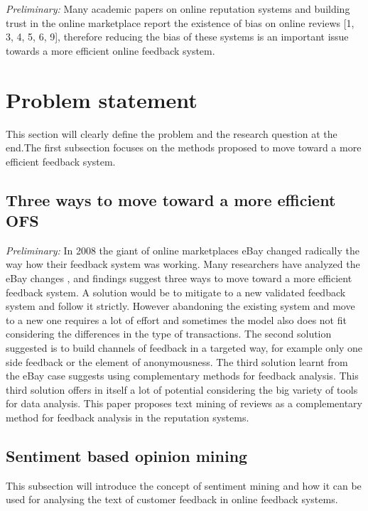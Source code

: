 \textit{Preliminary:} Many academic papers on online reputation systems and building trust in the online marketplace report the existence of bias on online reviews [1, 3, 4, 5, 6, 9], therefore reducing the bias of these systems is an important issue towards a more efficient online feedback system. 

\section{Problem statement}
\label{sec:problemstatement}
This section will clearly define the problem and the research question at the end.The first subsection focuses on the methods proposed to move toward a more efficient feedback system.

\subsection{Three ways to move toward a more efficient OFS}
\textit{Preliminary:} In 2008 the giant of online marketplaces eBay changed radically the way how their feedback system was working. Many researchers have analyzed the eBay changes \cite{fradkin2016bias,resnick2006value,bolton2013engineering,dini2009buying,dellarocas2008sound}, and findings suggest three ways to move toward a more efficient feedback system. A solution would be to mitigate to a new validated feedback system and follow it strictly. However abandoning the existing system and move to a new one requires a lot of effort and sometimes the model also does not fit considering the differences in the type of transactions. The second solution suggested is to build channels of feedback in a targeted way, for example only one side feedback or the element of anonymousness. The third solution learnt from the eBay case suggests using complementary methods for feedback analysis. This third solution offers in itself a lot of potential considering the big variety of tools for data analysis. This paper proposes text mining of reviews as a complementary method for feedback analysis in the reputation systems. 

\subsection{Sentiment based opinion mining}
This subsection will introduce the concept of sentiment mining and how it can be used for analysing the text of customer feedback in online feedback systems.


